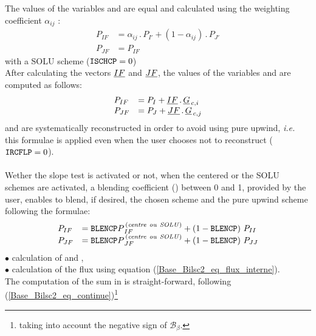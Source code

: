 \hspace*{1.5cm} The values of the variables   and  are equal and calculated
using the weighting coefficient $\displaystyle\alpha_{ij}$ :
\begin{equation}
\begin{array}{ll}
P_{IF} &=\displaystyle\alpha_{ij}\,.\, P_{I'} + (1 - \displaystyle\alpha_{ij})\,.\, P_{J'}\\
P_{JF} &= P_{IF}
\end{array}
\end{equation}
\hspace*{2.5cm}{\tiny$\bigstar$} with a SOLU scheme ($\text{\texttt{ISCHCP}} = 0$)\\
\hspace*{1.5cm} After calculating the vectors $\underline{IF}$ and $\underline{JF}$, the values of the variables  and  are computed as follows:
\begin{equation}
\begin{array}{ll}
P_{IF} &= P_I + \underline{IF}\,.\,\underline{G}_{\,c,i}\\
P_{JF} &= P_J + \underline{JF}\,.\,\underline{G}_{\,c,j}\\
\end{array}
\end{equation}
\hspace*{1.5cm}  and  are systematically reconstructed in order to avoid
using pure upwind, {\it i.e.} this formulae is applied even when the user
chooses not to reconstruct ($\text{\texttt{IRCFLP}} = 0$).\\\\

Wether the slope test is activated or not, when the centered or the SOLU schemes are activated,
a blending coefficient () between 0 and 1, provided by the user, enables to blend, if desired, the chosen scheme and the pure upwind scheme following the formulae:
\begin{equation}
\begin{array}{ll}
P_{IF} &= \text{\texttt{BLENCP}} P^{\,\it (centre\  ou\  SOLU) }_{\,IF} + (1 - \text{\texttt{BLENCP}})\  P_{II}\\
P_{JF} &= \text{\texttt{BLENCP}} P^{\,\it (centre\  ou\  SOLU) }_{\,JF} + (1 - \text{\texttt{BLENCP}})\  P_{JJ}\\
\end{array}
\end{equation}
$\bullet$ calculation of  and ,\\
$\bullet$ calculation of the flux  using equation (\ref{Base_Bilsc2_eq_flux_interne}).\\
The computation of the sum in  is straight-forward, following (\ref{Base_Bilsc2_eq_continue})\footnote{ taking into account the negative sign of $\mathcal{B_{\mathcal{\beta}}}$.}

